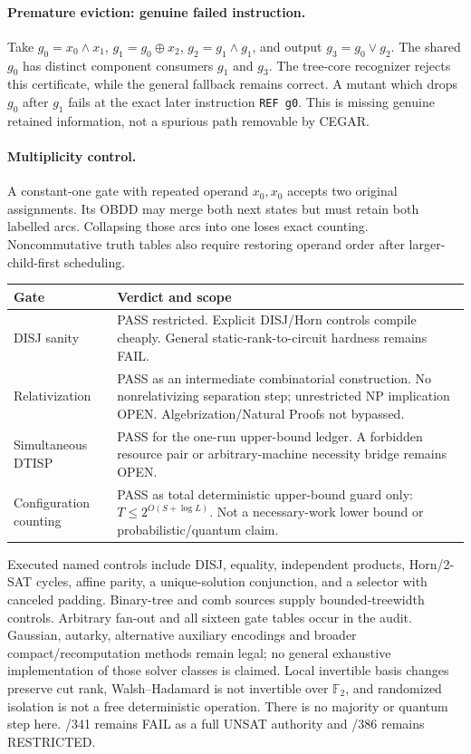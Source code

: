 \documentclass[11pt]{article}
\begin{document}
\paragraph{Premature eviction: genuine failed instruction.}
Take $g_0=x_0\land x_1$, $g_1=g_0\oplus x_2$, $g_2=g_1\land g_1$, and output $g_3=g_0\lor g_2$. The shared $g_0$ has distinct component consumers $g_1$ and $g_3$. The tree-core recognizer rejects this certificate, while the general fallback remains correct. A mutant which drops $g_0$ after $g_1$ fails at the exact later instruction \texttt{REF g0}. This is missing genuine retained information, not a spurious path removable by CEGAR.

\paragraph{Multiplicity control.}
A constant-one gate with repeated operand $x_0,x_0$ accepts two original assignments. Its OBDD may merge both next states but must retain both labelled arcs. Collapsing those arcs into one loses exact counting. Noncommutative truth tables also require restoring operand order after larger-child-first scheduling.

\begin{center}
\begin{tabular}{p{}p{}}
Gate & Verdict and scope\\\hline
DISJ sanity & PASS restricted. Explicit DISJ/Horn controls compile cheaply. General static-rank-to-circuit hardness remains FAIL.\\
Relativization & PASS as an intermediate combinatorial construction. No nonrelativizing separation step; unrestricted NP implication OPEN. Algebrization/Natural Proofs not bypassed.\\
Simultaneous DTISP & PASS for the one-run upper-bound ledger. A forbidden resource pair or arbitrary-machine necessity bridge remains OPEN.\\
Configuration counting & PASS as total deterministic upper-bound guard only: $T\le2^{O(S+\log L)}$. Not a necessary-work lower bound or probabilistic/quantum claim.\\
\end{tabular}
\end{center}

Executed named controls include DISJ, equality, independent products, Horn/2-SAT cycles, affine parity, a unique-solution conjunction, and a selector with canceled padding. Binary-tree and comb sources supply bounded-treewidth controls. Arbitrary fan-out and all sixteen gate tables occur in the audit. Gaussian, autarky, alternative auxiliary encodings and broader compact/recomputation methods remain legal; no general exhaustive implementation of those solver classes is claimed. Local invertible basis changes preserve cut rank, Walsh--Hadamard is not invertible over $\mathbb F_2$, and randomized isolation is not a free deterministic operation. There is no majority or quantum step here. /341 remains FAIL as a full UNSAT authority and /386 remains RESTRICTED.
\end{document}
